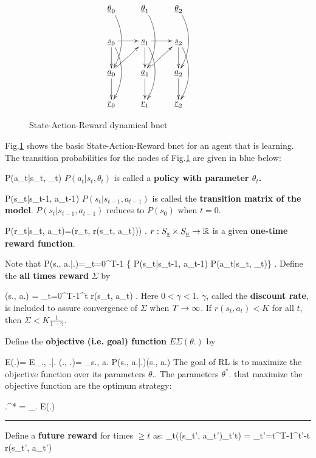 \begin{figure}
\centering
$$\xymatrix{
\rvtheta_0\ar@/^1pc/[dd]&
\rvtheta_1\ar@/^1pc/[dd]&
\rvtheta_2\ar@/^1pc/[dd]&\\
\rvs_0\ar[r]\ar[d]\ar@/^1pc/[dd]&
\rvs_1\ar[r]\ar[d]\ar@/^1pc/[dd]&
\rvs_2\ar[d]\ar@/^1pc/[dd]\\
\rva_0\ar[ur]\ar[d]&
\rva_1\ar[ur]\ar[d]&
\rva_2\ar[d]
\\
\rvr_0&
\rvr_1&
\rvr_2
}$$
\caption{State-Action-Reward dynamical bnet}
\label{fig-basic-rl}
\end{figure}

Fig.\ref{fig-basic-rl} shows
the basic State-Action-Reward bnet
for an agent that is learning.
The transition probabilities for the 
nodes of Fig.\ref{fig-basic-rl} are
given in blue below:

\beq\color{blue}P(a_t|s_t, \theta_t)
\eeq
 $P(a_t|s_t, \theta_t)$ is called  a
{\bf policy with parameter $\theta_t$.} 

\beq\color{blue}P(s_{t}|s_{t-1}, a_{t-1})
\eeq
$P(s_t|s_{t-1}, a_{t-1})$ is called the
 {\bf transition matrix of the model}. 
$P(s_t|s_{t-1}, a_{t-1})$ reduces to $P(s_0)$ when $t=0$.

\beq\color{blue}
P(r_t|s_t, a_t)=\delta(r_t, r(s_t, a_t)))
\;.\eeq
$r:S_{\underline{s}}\times S_{\underline{a}}\rightarrow { \mathbb{R}}$ 
is a given
 {\bf one-time reward function}.


Note that 
\beq
P(s., a.|\theta.)=\prod_{t=0}^{T-1}
\{
P(s_t|s_{t-1}, a_{t-1})
P(a_t|s_t, \theta_t)\}
\;.
\eeq
Define the {\bf all times reward} 
$\Sigma$ by

\beq
\Sigma(s., a.) = 
\sum_{t=0}^{T-1}\gamma^t r(s_t, a_t)
\;.
\eeq
Here $0<\gamma<1$. 
$\gamma$, called the {\bf discount rate},
is included to assure 
convergence of $\Sigma$ when
$T\rightarrow \infty$. 
If $r(s_t, a_t)< K$ for all $t$, then
$\Sigma< K \frac{1}{1-\gamma}$.

Define the {\bf objective (i.e. goal)
 function}
$E\Sigma(\theta.)$ by

\beq
E\Sigma(\theta.)=
E_{\rvs., \rva.|\theta.}
\Sigma(\rvs., \rva.)=
\sum_{s., a.}
P(s., a.|\theta.)\Sigma(s., a.)
\eeq
The goal of RL  is to
maximize the 
objective function over
its parameters $\theta.$.
The parameters $\theta^*.$ that 
maximize the objective function 
are the optimum strategy:

\beq 
\theta.^* = _{\theta.}
E\Sigma(\theta.)
\eeq

\hrule
Define a {\bf future reward} for
 times $\geq t$ as:
\beq
\Sigma_{\geq t}((s_{t'},
 a_{t'})_{t'\geq t}) =
 \sum_{t'=t}^{T-1}\gamma^{t'-t} r(s_{t'}, a_{t'})
\eeq

